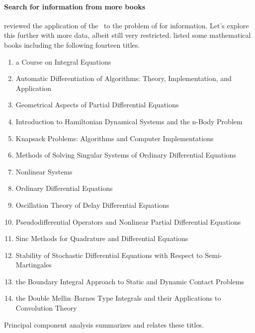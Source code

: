 \paragraph{Search for information from more books}
\cite{Berry95} reviewed the application of the \svd\ to the problem of  for information.
Let's explore this further with more data, albeit still very restricted.
\cite{Berry95} listed some mathematical books including the following fourteen titles.
\begin{enumerate}
\item a Course on Integral Equations
\item Automatic Differentiation of Algorithms: Theory, Implementation, and Application
\item Geometrical Aspects of Partial Differential Equations
\item Introduction to Hamiltonian Dynamical Systems and the n-Body Problem
\item Knapsack Problems: Algorithms and Computer Implementations 
\item Methods of Solving Singular Systems of Ordinary Differential Equations
\item Nonlinear Systems
\item Ordinary Differential Equations
\item Oscillation Theory of Delay Differential Equations 
\item Pseudodifferential Operators and Nonlinear Partial Differential Equations
\item Sinc Methods for Quadrature and Differential Equations 
\item Stability of Stochastic Differential Equations with Respect to Semi-Martingales
\item the Boundary Integral Approach to Static and Dynamic Contact Problems
\item the Double Mellin--Barnes Type Integrals and their Applications to Convolution Theory
\end{enumerate}
Principal component analysis summarizes and relates these titles.
